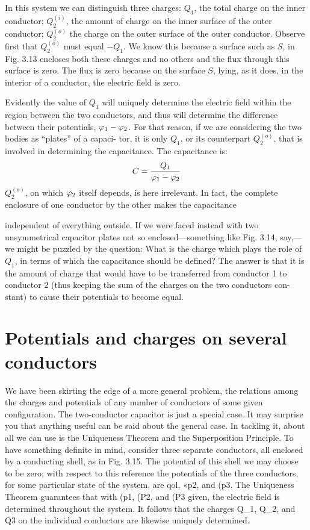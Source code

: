 In this system we can distinguish three charges: $Q_1$, the total
charge on the inner conductor; $Q_2^{(i)}$, the amount of charge on the
inner surface of the outer conductor; $Q_2^{(o)}$ the charge on the outer
surface of the outer conductor. Observe first that $Q_2^{(o)}$ must equal
$-Q_1$. We know this because a surface such as $S$, in Fig. 3.13 encloses
both these charges and no others and the flux through this
surface is zero. The flux is zero because on the surface $S$, lying, as
it does, in the interior of a conductor, the electric field is zero.

Evidently the value of $Q_1$ will uniquely determine the electric field
within the region between the two conductors, and thus will determine
the difference between their potentials, $\varphi_1-\varphi_2$. For that
reason, if we are considering the two bodies as ``plates'' of a capaci-
tor, it is only $Q_1$, or its counterpart $Q_2^{(o)}$, that is involved in determining
the capacitance. The capacitance is:
\begin{equation}
  C = \frac{Q_1}{\varphi_1-\varphi_2}
\end{equation}
$Q_2^{(o)}$, on which $\varphi_2$ itself depends, is here irrelevant. In fact, the complete
enclosure of one conductor by the other makes the capacitance

independent of everything outside. If we were faced instead with
two unsymmetrical capacitor plates not so enclosed---something like
Fig. 3.14, say,---we might be puzzled by the question: What is the
charge which plays the role of $Q_1$, in terms of which the capacitance
should be defined? The answer is that it is the amount of charge
that would have to be transferred from conductor 1 to conductor 2
(thus keeping the sum of the charges on the two conductors con-
stant) to cause their potentials to become equal.

\iffalse

\section{Potentials and charges on several conductors}

We have been skirting the edge of a more general problem, the
relations among the charges and potentials of any number of conductors
of some given configuration. The two-conductor capacitor
is just a special case. It may surprise you that anything useful can
be said about the general case. In tackling it, about all we can use
is the Uniqueness Theorem and the Superposition Principle. To
have something definite in mind, consider three separate conductors,
all enclosed by a conducting shell, as in Fig. 3.15. The potential of
this shell we may choose to be zero; with respect to this reference the
potentials of the three conductors, for some particular state of the
system, are qol, «p2, and (p3. The Uniqueness Theorem guarantees
that with (p1, (P2, and (P3 given, the electric field is determined throughout
the system. It follows that the charges Q_1, Q_2, and Q3 on the
individual conductors are likewise uniquely determined.


